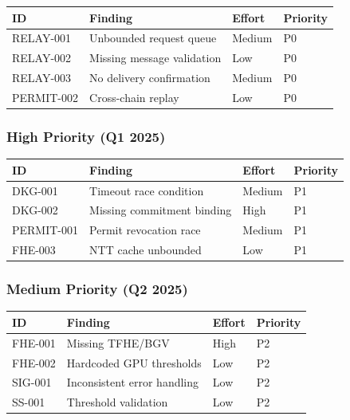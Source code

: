 \documentclass[
]{article}
\newcounter{none} %
\begin{document}
{\def\LTcaptype{none} %
\begin{longtable}[]{@{}llll@{}}
\toprule\noalign{}
ID & Finding & Effort & Priority \\
\midrule\noalign{}
\endhead
\bottomrule\noalign{}
\endlastfoot
RELAY-001 & Unbounded request queue & Medium & P0 \\
RELAY-002 & Missing message validation & Low & P0 \\
RELAY-003 & No delivery confirmation & Medium & P0 \\
PERMIT-002 & Cross-chain replay & Low & P0 \\
\end{longtable}
}

\subsubsection{High Priority (Q1 2025)}\label{high-priority-q1-2025}

{\def\LTcaptype{none} %
\begin{longtable}[]{@{}llll@{}}
\toprule\noalign{}
ID & Finding & Effort & Priority \\
\midrule\noalign{}
\endhead
\bottomrule\noalign{}
\endlastfoot
DKG-001 & Timeout race condition & Medium & P1 \\
DKG-002 & Missing commitment binding & High & P1 \\
PERMIT-001 & Permit revocation race & Medium & P1 \\
FHE-003 & NTT cache unbounded & Low & P1 \\
\end{longtable}
}

\subsubsection{Medium Priority (Q2 2025)}\label{medium-priority-q2-2025}

{\def\LTcaptype{none} %
\begin{longtable}[]{@{}llll@{}}
\toprule\noalign{}
ID & Finding & Effort & Priority \\
\midrule\noalign{}
\endhead
\bottomrule\noalign{}
\endlastfoot
FHE-001 & Missing TFHE/BGV & High & P2 \\
FHE-002 & Hardcoded GPU thresholds & Low & P2 \\
SIG-001 & Inconsistent error handling & Low & P2 \\
SS-001 & Threshold validation & Low & P2 \\
\end{longtable}
}
\end{document}
